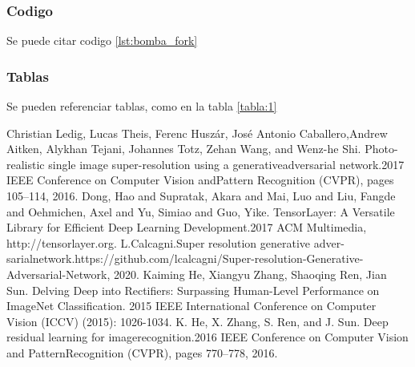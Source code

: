 \documentclass[journal]{IEEEtran}
\begin{document}
\subsubsection{Codigo}
Se puede citar codigo \ref{lst:bomba_fork}
\subsubsection{Tablas}
Se pueden referenciar tablas, como en la tabla \ref{tabla:1}

\newpage
\listoffigures
\listoftables
\lstlistoflistings

\begin{thebibliography}{2}

Christian Ledig, Lucas Theis, Ferenc Huszár, José Antonio Caballero,Andrew Aitken, Alykhan Tejani, Johannes Totz, Zehan Wang, and Wenz-he Shi. Photo-realistic single image super-resolution using a generativeadversarial network.2017 IEEE Conference on Computer Vision andPattern Recognition (CVPR), pages 105–114, 2016.
Dong, Hao and Supratak, Akara and Mai, Luo and Liu, Fangde and Oehmichen, Axel and Yu, Simiao and Guo, Yike. TensorLayer: A Versatile Library for Efficient Deep Learning Development.2017 ACM Multimedia, http://tensorlayer.org.
L.Calcagni.Super    resolution    generative    adver-sarialnetwork.https://github.com/lcalcagni/Super-resolution-Generative-Adversarial-Network, 2020.
Kaiming He, Xiangyu Zhang, Shaoqing Ren, Jian Sun.
Delving Deep into Rectifiers: Surpassing Human-Level Performance on ImageNet Classification. 2015 IEEE International Conference on Computer Vision (ICCV) (2015): 1026-1034.
K. He, X. Zhang, S. Ren, and J. Sun. Deep residual learning for imagerecognition.2016 IEEE Conference on Computer Vision and PatternRecognition (CVPR), pages 770–778, 2016.
\end{thebibliography}
\end{document}
